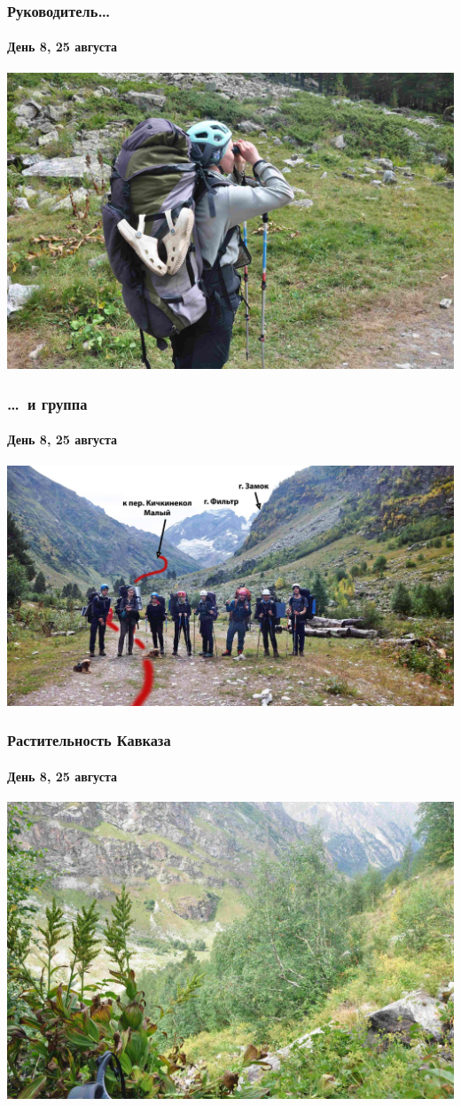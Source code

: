 \begin{frame}
	\frametitle{Руководитель\dots}
	\framesubtitle{День 8, 25 августа}
	\centering
	\includegraphics[width=\textwidth]{../pics/DSC_0128}			
\end{frame}

\begin{frame}
	\frametitle{\dots~и группа}
	\framesubtitle{День 8, 25 августа}
	\centering
	\includegraphics[width=\textwidth]{../pics/DSC_0127}			
\end{frame}

\begin{frame}
\frametitle{Растительность Кавказа}
	\framesubtitle{День 8, 25 августа}
	\centering
	\includegraphics[width=\textwidth]{../pics/DSC_0143}			
\end{frame}

